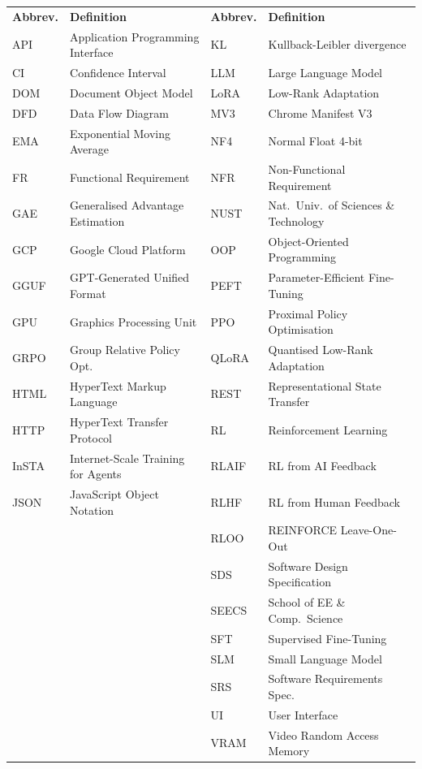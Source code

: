 \documentclass[12pt,a4paper]{report}
\begin{document}
\begin{tabular}{@{}p{1.4cm}p{5.6cm}p{1.4cm}p{5.2cm}@{}}
\textbf{Abbrev.} & \textbf{Definition} & \textbf{Abbrev.} & \textbf{Definition} \\[0.3cm]
API  & Application Programming Interface & KL    & Kullback-Leibler divergence \\
CI   & Confidence Interval               & LLM   & Large Language Model \\
DOM  & Document Object Model             & LoRA  & Low-Rank Adaptation \\
DFD  & Data Flow Diagram                 & MV3   & Chrome Manifest V3 \\
EMA  & Exponential Moving Average        & NF4   & Normal Float 4-bit \\
FR   & Functional Requirement            & NFR   & Non-Functional Requirement \\
GAE  & Generalised Advantage Estimation  & NUST  & Nat.\ Univ.\ of Sciences \& Technology \\
GCP  & Google Cloud Platform             & OOP   & Object-Oriented Programming \\
GGUF & GPT-Generated Unified Format      & PEFT  & Parameter-Efficient Fine-Tuning \\
GPU  & Graphics Processing Unit          & PPO   & Proximal Policy Optimisation \\
GRPO & Group Relative Policy Opt.        & QLoRA & Quantised Low-Rank Adaptation \\
HTML & HyperText Markup Language         & REST  & Representational State Transfer \\
HTTP & HyperText Transfer Protocol       & RL    & Reinforcement Learning \\
InSTA & Internet-Scale Training for Agents & RLAIF & RL from AI Feedback \\
JSON & JavaScript Object Notation        & RLHF  & RL from Human Feedback \\
     &                                   & RLOO  & REINFORCE Leave-One-Out \\
     &                                   & SDS   & Software Design Specification \\
     &                                   & SEECS & School of EE \& Comp.\ Science \\
     &                                   & SFT   & Supervised Fine-Tuning \\
     &                                   & SLM   & Small Language Model \\
     &                                   & SRS   & Software Requirements Spec. \\
     &                                   & UI    & User Interface \\
     &                                   & VRAM  & Video Random Access Memory \\
\end{tabular}
\end{document}

